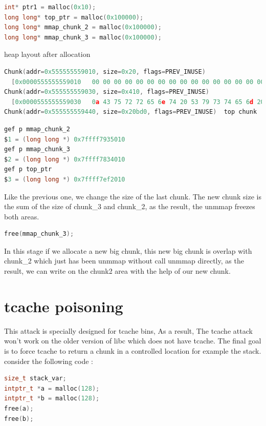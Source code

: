 \documentclass{masterthesis}
\newcommand*\tch{tcache}
\begin{document}
\begin{lstlisting}[language=c,frame=tlrb]
int* ptr1 = malloc(0x10);
long long* top_ptr = malloc(0x100000);
long long* mmap_chunk_2 = malloc(0x100000);
long long* mmap_chunk_3 = malloc(0x100000);
\end{lstlisting}

heap layout after allocation 

\begin{lstlisting}[language=c,frame=tlrb]
Chunk(addr=0x555555559010, size=0x20, flags=PREV_INUSE)
  [0x0000555555559010   00 00 00 00 00 00 00 00 00 00 00 00 00 00 00 00  ................]
Chunk(addr=0x555555559030, size=0x410, flags=PREV_INUSE)
  [0x0000555555559030   0a 43 75 72 72 65 6e 74 20 53 79 73 74 65 6d 20  .Current System ]
Chunk(addr=0x555555559440, size=0x20bd0, flags=PREV_INUSE)  top chunk
\end{lstlisting}

\begin{lstlisting}[language=c,frame=tlrb]
gef p mmap_chunk_2
$1 = (long long *) 0x7ffff7935010
gef p mmap_chunk_3
$2 = (long long *) 0x7ffff7834010
gef p top_ptr
$3 = (long long *) 0x7ffff7ef2010
\end{lstlisting}

Like the previous one, we change the size of the last chunk. The new chunk size is the sum of the size of chunk\_3 and chunk\_2, as the result, the unmmap freezes both areas.

\begin{lstlisting}[language=c,frame=tlrb]
free(mmap_chunk_3);
\end{lstlisting}

In this stage if we allocate a new big chunk, this new big chunk is overlap with chunk\_2 which just has been unmmap without call unmmap directly, as the result, we can write on the chunk2 area with the help of our new chunk.

\section{\tch{} poisoning}
This attack is specially designed for \tch{} bins, As a result, The \tch{} attack won't work on the older version of libc which does not have \tch{}. The final goal is to force \tch{} to return a chunk in a controlled location for example the stack. consider the following code : 

\begin{lstlisting}[language=c,frame=tlrb]
size_t stack_var;
intptr_t *a = malloc(128);
intptr_t *b = malloc(128);
free(a);
free(b);
\end{lstlisting}
\end{document}
